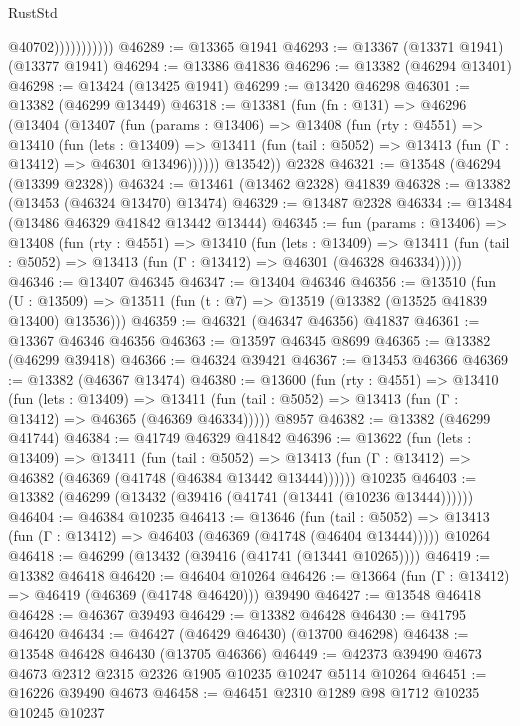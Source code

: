 \begin{lexlean}{RustStd}
\begin{coremodule}
                          @40702)))))))))))
@46289 := @13365 @1941
@46293 := @13367 (@13371 @1941) (@13377 @1941)
@46294 := @13386 @41836
@46296 := @13382 (@46294 @13401)
@46298 := @13424 (@13425 @1941)
@46299 := @13420 @46298
@46301 := @13382 (@46299 @13449)
@46318 := @13381
    (fun (fn : @131) =>
    @46296
      (@13404
        (@13407
          (fun (params : @13406) =>
          @13408
            (fun (rty : @4551) =>
            @13410
              (fun (lets : @13409) =>
              @13411 (fun (tail : @5052) => @13413 (fun (Γ : @13412) => @46301 @13496))))))
        @13542))
    @2328
@46321 := @13548 (@46294 (@13399 @2328))
@46324 := @13461 (@13462 @2328) @41839
@46328 := @13382 (@13453 (@46324 @13470) @13474)
@46329 := @13487 @2328
@46334 := @13484 (@13486 @46329 @41842 @13442 @13444)
@46345 := fun (params : @13406) =>
  @13408
    (fun (rty : @4551) =>
    @13410
      (fun (lets : @13409) =>
      @13411 (fun (tail : @5052) => @13413 (fun (Γ : @13412) => @46301 (@46328 @46334)))))
@46346 := @13407 @46345
@46347 := @13404 @46346
@46356 := @13510
    (fun (U : @13509) => @13511 (fun (t : @7) => @13519 (@13382 (@13525 @41839 @13400) @13536)))
@46359 := @46321 (@46347 @46356) @41837
@46361 := @13367 @46346 @46356
@46363 := @13597 @46345 @8699
@46365 := @13382 (@46299 @39418)
@46366 := @46324 @39421
@46367 := @13453 @46366
@46369 := @13382 (@46367 @13474)
@46380 := @13600
    (fun (rty : @4551) =>
    @13410
      (fun (lets : @13409) =>
      @13411 (fun (tail : @5052) => @13413 (fun (Γ : @13412) => @46365 (@46369 @46334)))))
    @8957
@46382 := @13382 (@46299 @41744)
@46384 := @41749 @46329 @41842
@46396 := @13622
    (fun (lets : @13409) =>
    @13411
      (fun (tail : @5052) =>
      @13413 (fun (Γ : @13412) => @46382 (@46369 (@41748 (@46384 @13442 @13444))))))
    @10235
@46403 := @13382 (@46299 (@13432 (@39416 (@41741 (@13441 (@10236 @13444))))))
@46404 := @46384 @10235
@46413 := @13646
    (fun (tail : @5052) => @13413 (fun (Γ : @13412) => @46403 (@46369 (@41748 (@46404 @13444)))))
    @10264
@46418 := @46299 (@13432 (@39416 (@41741 (@13441 @10265))))
@46419 := @13382 @46418
@46420 := @46404 @10264
@46426 := @13664 (fun (Γ : @13412) => @46419 (@46369 (@41748 @46420))) @39490
@46427 := @13548 @46418
@46428 := @46367 @39493
@46429 := @13382 @46428
@46430 := @41795 @46420
@46434 := @46427 (@46429 @46430) (@13700 @46298)
@46438 := @13548 @46428 @46430 (@13705 @46366)
@46449 := @42373 @39490 @4673 @4673 @2312 @2315 @2326 @1905 @10235 @10247 @5114 @10264
@46451 := @16226 @39490 @4673
@46458 := @46451 @2310 @1289 @98 @1712 @10235 @10245 @10237

\end{coremodule}
\end{lexlean}

